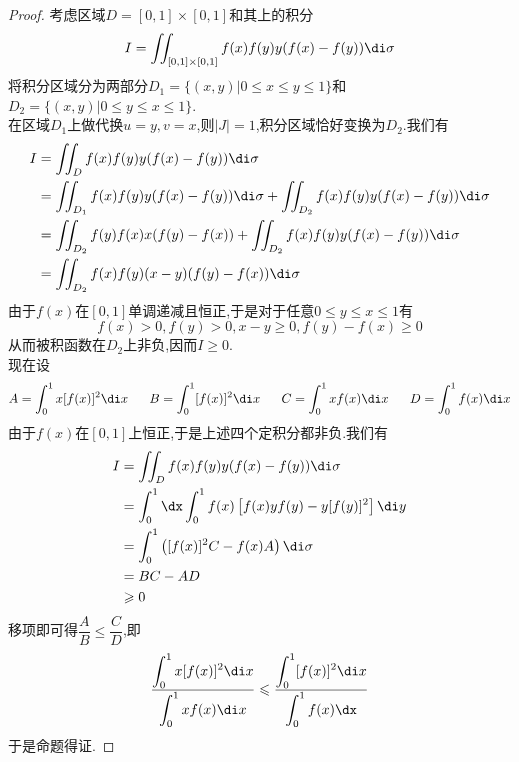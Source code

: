 \documentclass{ctexart}
\begin{document}
\begin{proof}
    考虑区域$D=[0,1]\times[0,1]$和其上的积分
    \[I=\iint_{[0,1]\times[0,1]}f(x)f(y)y(f(x)-f(y))\di\sigma\]
    将积分区域分为两部分$D_1=\{(x,y)|0\leqslant x\leqslant y\leqslant 1\}$和$D_2=\{(x,y)|0\leqslant y\leqslant x\leqslant1\}$.\\
    在区域$D_1$上做代换$u=y,v=x$,则$|J|=1$,积分区域恰好变换为$D_2$.我们有
    \[\begin{aligned}
        I
        &= \iint_Df(x)f(y)y(f(x)-f(y))\di\sigma\\
        &= \iint_{D_1}f(x)f(y)y(f(x)-f(y))\di\sigma+\iint_{D_2}f(x)f(y)y(f(x)-f(y))\di\sigma \\
        &= \iint_{D_2}f(y)f(x)x(f(y)-f(x))+\iint_{D_2}f(x)f(y)y(f(x)-f(y))\di\sigma \\
        &= \iint_{D_2}f(x)f(y)(x-y)(f(y)-f(x))\di\sigma
    \end{aligned}\]
    由于$f(x)$在$[0,1]$单调递减且恒正,于是对于任意$0\leqslant y\leqslant x\leqslant1$有
    \[f(x)>0,f(y)>0,x-y\geqslant0,f(y)-f(x)\geqslant0\]
    从而被积函数在$D_2$上非负,因而$I\geqslant0$.\\
    现在设
    \[A=\int_0^1x[f(x)]^2\di x\ \ \ \ \ 
    B=\int_0^1[f(x)]^2\di x\ \ \ \ \ 
    C=\int_0^1xf(x)\di x\ \ \ \ \ 
    D=\int_0^1f(x)\di x\]
    由于$f(x)$在$[0,1]$上恒正,于是上述四个定积分都非负.我们有
    \[\begin{aligned}
        I
        &= \iint_Df(x)f(y)y(f(x)-f(y))\di\sigma\\
        &= \int_0^1\dx\int_0^1f(x)\left[f(x)yf(y)-y[f(y)]^2\right]\di y \\
        &= \int_0^1\left([f(x)]^2C-f(x)A\right)\di\sigma \\
        &= BC-AD\\
        &\geqslant0
    \end{aligned}\]
    移项即可得$\dfrac{A}{B}\leqslant\dfrac{C}{D}$,即
    \[\dfrac{\displaystyle\int_0^1x[f(x)]^2\di x}{\displaystyle\int_0^1xf(x)\di x}\leqslant\dfrac{\displaystyle\int_0^1[f(x)]^2\di x}{\displaystyle\int_0^1f(x)\dx}\]
    于是命题得证.
\end{proof}
\end{document}
